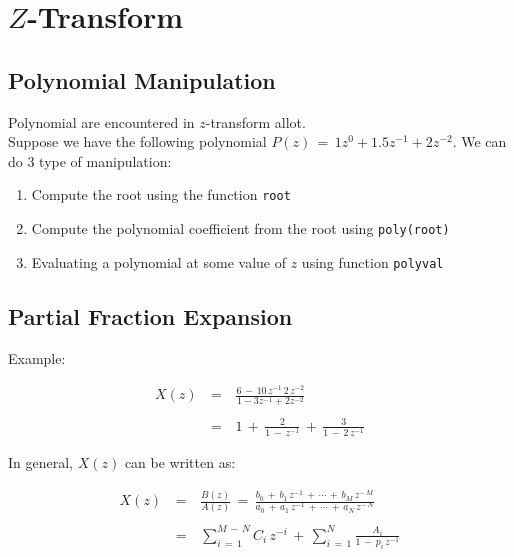 


\chapter{$Z$-Transform}

\section{Polynomial Manipulation}

Polynomial are encountered in $z$-transform allot.\\

Suppose we have the following polynomial $P(z) \, = \,1 z^0 + 1.5 z^{-1} + 2 z^{-2}$. We can do 3 type of manipulation:

\begin{enumerate}
    
\item Compute the root using the function \verb|root|

\item Compute the polynomial coefficient from the root using \verb|poly(root)|

\item Evaluating a polynomial at some value of $z$ using function \verb|polyval|

\end{enumerate}


\section{Partial Fraction Expansion}

Example:

\begin{equation}
\begin{array}{rcl}
    X(z) \, &=& \, \displaystyle\frac{6 \, - \, 10 \, z^{-1} \, 2 \, z^{-2}}{1 - 3 z^{-1} + 2 z^{-2}}  \\ \\
     &=& \, 1 \, + \,  \displaystyle\frac{2}{1 \, - \,z^{-1} } \, + \, \displaystyle\frac{3}{1 \, - \,2 \, z^{-1}}
\end{array}    
\end{equation}

In general, $X(z)$ can be written as:

\begin{equation}
\begin{array}{rcl}
X(z) \, &=& \, \displaystyle\frac{B(z)}{A(z)}   \, = \, \displaystyle\frac{b_0 \, + \, b_1 \, z^{-1} \, + \, \cdots \, + \, b_M \, z^{- \, M}}{a_0 \, + \, a_1 \, z^{-1} \, + \, \cdots \, + \, a_N \, z^{- \, N}} \\ \\
	    &=& \, \displaystyle\sum\limits_{i \, = \, 1}^{M \, - \, N} C_i \, z^{-i} \, + \,  \displaystyle\sum\limits_{i \, = \, 1}^N\frac{A_i}{1 \, - \, p_i \, z^{-1}}
 \end{array}
\end{equation}

